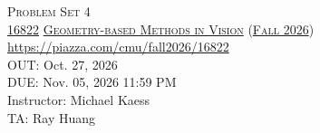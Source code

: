 \documentclass[11pt,addpoints,answers]{exam}
\title{\textsc{\hwName}} %
\author{}
\date{}
\date{}
\numberwithin{equation}{section} %
\numberwithin{figure}{section} %
\numberwithin{table}{section} %
\newcommand{\courseNum}{\href{https://geometric3d.github.io}{16822}}
\newcommand{\courseName}{\href{https://geometric3d.github.io}{Geometry-based Methods in Vision}}
\newcommand{\courseSem}{\href{https://geometric3d.github.io}{Fall 2026}}
\newcommand{\courseUrl}{\url{https://piazza.com/cmu/fall2026/16822}}
\newcommand{\hwNum}{Problem Set 4}
\newcommand{\hwTopic}{N-view Geometry}
\newcommand{\outDate}{Oct. 27, 2026}
\newcommand{\dueDate}{Nov. 05, 2026 11:59 PM}
\newcommand{\instructorName}{Michael Kaess}
\newcommand{\taNames}{Ray Huang}
\begin{document}
\section*{}
\begin{center}
  \textsc{\LARGE \hwNum} \\
  \vspace{1em}
  \textsc{\large \courseNum{} \courseName{} (\courseSem)} \\
  \courseUrl\\
  \vspace{1em}
  OUT: \outDate \\
  DUE: \dueDate \\
  Instructor: \instructorName \\
  TA: \taNames
\end{center}
\end{document}
